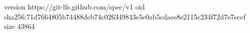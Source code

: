 version https://git-lfs.github.com/spec/v1
oid sha256:71d7664805b74488dcb74c026349843e5e0ab5cdaee8e2115c234f72d7e7eccf
size 43864
